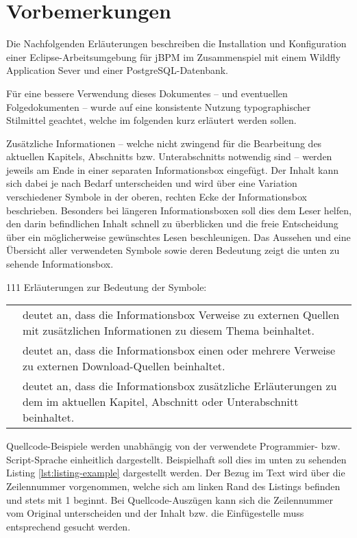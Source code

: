 \section{Vorbemerkungen}
Die Nachfolgenden Erläuterungen beschreiben die Installation und Konfiguration einer Eclipse-Arbeitsumgebung für jBPM im Zusammenspiel mit einem Wildfly Application Sever und einer PostgreSQL-Datenbank.

Für eine bessere Verwendung dieses Dokumentes -- und eventuellen Folgedokumenten -- wurde auf eine konsistente Nutzung typographischer Stilmittel geachtet, welche im folgenden kurz erläutert werden sollen.

Zusätzliche Informationen -- welche nicht zwingend für die Bearbeitung des aktuellen Kapitels, Abschnitts bzw. Unterabschnitts notwendig sind -- werden jeweils am Ende in einer separaten Informationsbox eingefügt. Der Inhalt kann sich dabei je nach Bedarf unterscheiden und wird über eine Variation verschiedener Symbole in der oberen, rechten Ecke der Informationsbox beschrieben. Besonders bei längeren Informationsboxen soll dies dem Leser helfen, den darin befindlichen Inhalt schnell zu überblicken und die freie Entscheidung über ein möglicherweise gewünschtes Lesen beschleunigen. Das Aussehen und eine Übersicht aller verwendeten Symbole sowie deren Bedeutung zeigt die unten zu sehende Informationsbox.
\begin{info}{111}
	Erläuterungen zur Bedeutung der Symbole:\\[1em]
	\begin{tabular}{m{2em}m{}}
	\bookmarkicon	& deutet an, dass die Informationsbox Verweise zu externen Quellen mit zusätzlichen Informationen zu diesem Thema beinhaltet. \\[0.5em] 
	\downloadicon	& deutet an, dass die Informationsbox einen oder mehrere Verweise zu externen Download-Quellen beinhaltet. \\[0.5em]
	\fileicon	& deutet an, dass die Informationsbox zusätzliche Erläuterungen zu dem im aktuellen Kapitel, Abschnitt oder Unterabschnitt beinhaltet.
	\end{tabular}
\end{info}
Quellcode-Beispiele werden unabhängig von der verwendete Programmier- bzw. Script-Sprache einheitlich dargestellt. Beispielhaft soll dies im unten zu sehenden Listing \ref{lst:listing-example} dargestellt werden. 
Der Bezug im Text wird über die Zeilennummer vorgenommen, welche sich am linken Rand des Listings befinden und stets mit 1 beginnt. Bei Quellcode-Auszügen kann sich die Zeilennummer vom Original unterscheiden und der Inhalt bzw. die Einfügestelle muss entsprechend gesucht werden.